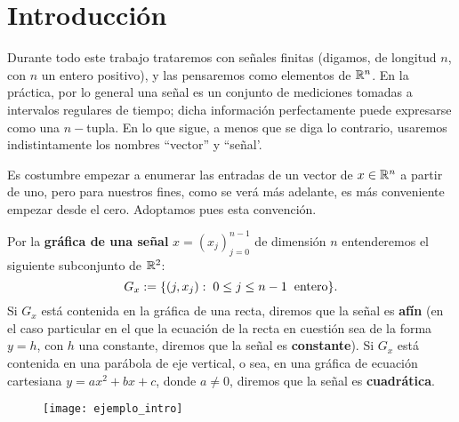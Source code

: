 \chapter{Introducción}
\label{chapter: introduccion}
Durante todo este trabajo trataremos con señales
finitas
(digamos, de
longitud $n$, con $n$
un entero positivo), y las pensaremos como elementos de $\mathbb{R}^{n}$.
En la práctica, por lo general
una señal es un conjunto de mediciones tomadas
a intervalos regulares de tiempo; dicha
información perfectamente puede expresarse como 
una $n-$tupla. En lo que sigue, a menos que se diga
lo contrario, usaremos indistintamente los nombres
``vector'' y ``señal'.

Es costumbre empezar
a enumerar las entradas de un vector
de $x \in \mathbb{R}^{n}$ a partir de uno, pero
para nuestros fines,
como se verá más adelante, es más 
conveniente empezar desde el cero.
Adoptamos pues esta convención.


\begin{defi}
\label{def: grafica senial}
Por la \textbf{gráfica de una señal} $x=(x_{j})_{j=0}^{n-1}$
de dimensión $n$ entenderemos
 el siguiente subconjunto de $\mathbb{R}^{2}$:
\[
G_{x} := 
\{ (j, x_{j} ) : \hspace{0.1cm} 0 \leq j \leq n-1
\hspace{0.2cm} \text{entero}\} .
\]
Si $G_{x}$ está contenida en la gráfica de una recta, diremos que la
señal es \textbf{afín}
(en el caso particular en el que
la ecuación de la recta en cuestión sea de la forma $y= h$,
con $h$ una constante,
diremos que la señal es
\textbf{constante}). Si  $G_{x}$ está contenida en 
una parábola de eje vertical, o sea, en una
gráfica de ecuación cartesiana
$y=ax^{2}+ bx +c$, donde $a \neq 0$, diremos 
que la señal es \textbf{cuadrática}.
\end{defi}


\begin{figure}[H]
	\texttt{[image: ejemplo\_intro]} 
 \end{figure}

